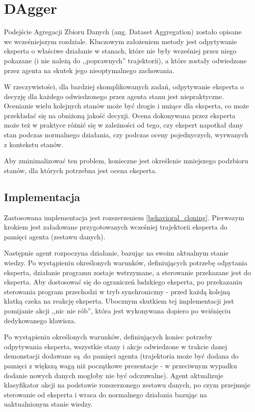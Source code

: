 \section{DAgger}\label{dagger}

Podejście Agregacji Zbioru Danych (ang. Dataset Aggregation) \cite{DBLP:journals/corr/abs-1011-0686} zostało opisane we wcześniejszym rozdziale. Kluczowym założeniem metody jest odpytywanie eksperta o właściwe działanie w stanach, które nie były wcześniej przez niego pokazane (i nie należą do ,,poprawnych'' trajektorii), a które zostały odwiedzone przez agenta na skutek jego nieoptymalnego zachowania.

W rzeczywistości, dla bardziej skomplikowanych zadań, odpytywanie eksperta o decyzję dla każdego odwiedzonego przez agenta stanu jest niepraktyczne. Ocenianie wielu kolejnych stanów może być drogie i nużące dla eksperta, co może przekładać się na obniżoną jakość decyzji. Ocena dokonywana przez eksperta może też w praktyce różnić się w zależności od tego, czy ekspert napotkał dany stan podczas normalnego działania, czy podczas oceny pojednyczych, wyrwanych z kontekstu stanów.

Aby zminimalizować ten problem, konieczne jest określenie mniejszego podzbioru stanów, dla których potrzebna jest ocena eksperta.


\subsection{Implementacja} 
Zastosowana implementacja jest rozszerzeniem \ref{behavioral_cloning}. Pierwszym krokiem jest załadowane przygotowanych wcześniej trajektorii eksperta do pamięci agenta (zestawu danych).

Następnie agent rozpoczyna działanie, bazując na swoim aktualnym stanie wiedzy. Po wystąpieniu określonych warunków, definiujących potrzebę odpytania eksperta, działanie programu zostaje wstrzymane, a sterowanie przekazane jest do eksperta. Aby dostosować się do ograniczeń ludzkiego eksperta, po przekazaniu sterowania program przechodzi w tryb synchroniczny - przed każdą kolejną klatką czeka na reakcję eksperta. Ubocznym skutkiem tej implementacji jest pomijanie akcji ,,nic nie rób'', która jest wykonywana dopiero po wciśnięciu dedykowanego klawisza.

Po wystąpieniu określonych warunków, definiujących koniec potrzeby odpytywania eksperta, wszystkie stany i akcje odwiedzone w trakcie danej demonstacji dodawane są do pamięci agenta (trajektoria może być dodana do pamięci z większą wagą niż początkowe prezentacje - w przeciwnym wypadku dodanie nowych danych mogłoby nie być odczuwalne). Agent aktualizuje klasyfikator akcji na podstawie rozszerzonego zestawu danych, po czym przejmuje sterowanie od eksperta i wraca do normalnego działania bazując na uaktualnionym stanie wiedzy.

